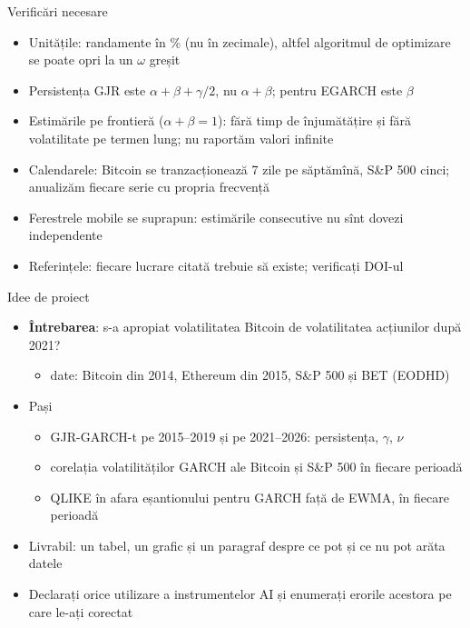 \begin{frame}{Verificări necesare}
\itemsize{\small}
\begin{itemize}
    \item Unitățile: randamente în \% (nu în zecimale), altfel algoritmul de optimizare se poate opri la un $\omega$ greșit
    \item Persistența GJR este $\alpha + \beta + \gamma/2$, nu $\alpha + \beta$; pentru EGARCH este $\beta$
    \item Estimările pe frontieră ($\alpha + \beta = 1$): fără timp de înjumătățire și fără volatilitate pe termen lung; nu raportăm valori infinite
    \item Calendarele: Bitcoin se tranzacționează 7 zile pe săptămînă, S\&P 500 cinci; anualizăm fiecare serie cu propria frecvență
    \item Ferestrele mobile se suprapun: estimările consecutive nu sînt dovezi independente
    \item Referințele: fiecare lucrare citată trebuie să existe; verificați DOI-ul
\end{itemize}
\end{frame}

\begin{frame}{Idee de proiect}
\itemsize{\small}
\begin{itemize}
    \item \textbf{Întrebarea}: s-a apropiat volatilitatea Bitcoin de volatilitatea acțiunilor după 2021?
    \begin{itemize}
        \item date: Bitcoin din 2014, Ethereum din 2015, S\&P 500 și BET (EODHD)
    \end{itemize}
    \item Pași
    \begin{itemize}
        \item GJR-GARCH-t pe 2015--2019 și pe 2021--2026: persistența, $\gamma$, $\nu$
        \item corelația volatilităților GARCH ale Bitcoin și S\&P 500 în fiecare perioadă
        \item QLIKE în afara eșantionului pentru GARCH față de EWMA, în fiecare perioadă
    \end{itemize}
    \item Livrabil: un tabel, un grafic și un paragraf despre ce pot și ce nu pot arăta datele
    \item Declarați orice utilizare a instrumentelor AI și enumerați erorile acestora pe care le-ați corectat
\end{itemize}
\end{frame}


